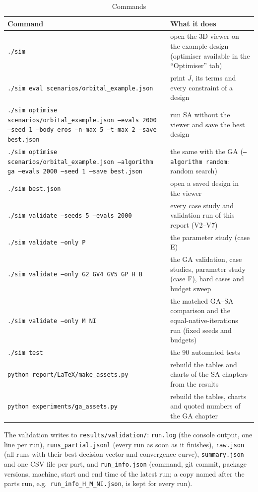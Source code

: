 \begin{table}[H]
\centering
\caption{Commands}
\label{tab:commands}
\footnotesize
\begin{tabularx}{\textwidth}{@{}>{\raggedright\arraybackslash}p{7.6cm}X@{}}
\toprule
Command & What it does \\
\midrule
\texttt{./sim} & open the 3D viewer on the example design (optimiser available in the ``Optimiser'' tab) \\
\texttt{./sim eval scenarios/orbital\_example.json} & print $J$, its terms and every constraint of a design \\
\texttt{./sim optimise scenarios/orbital\_example.json --evals 2000 --seed 1 --body eros --n-max 5 --t-max 2 --save best.json} & run \ac{SA} without the viewer and save the best design \\
\texttt{./sim optimise scenarios/orbital\_example.json --algorithm ga --evals 2000 --seed 1 --save best.json} & the same with the \ac{GA} (\texttt{--algorithm random}: random search) \\
\texttt{./sim best.json} & open a saved design in the viewer \\
\texttt{./sim validate --seeds 5 --evals 2000} & every case study and validation run of this report (V2--V7) \\
\texttt{./sim validate --only P} & the parameter study (case E) \\
\texttt{./sim validate --only G2 GV4 GV5 GP H B} & the \ac{GA} validation, case studies, parameter study (case F), hard cases and budget sweep \\
\texttt{./sim validate --only M NI} & the matched GA--SA comparison and the equal-native-iterations run (fixed seeds and budgets) \\
\texttt{./sim test} & the 90 automated tests \\
\texttt{python report/LaTeX/make\_assets.py} & rebuild the tables and charts of the \ac{SA} chapters from the results \\
\texttt{python experiments/ga\_assets.py} & rebuild the tables, charts and quoted numbers of the \ac{GA} chapter \\
\bottomrule
\end{tabularx}
\end{table}

The validation writes to \texttt{results/validation/}: \texttt{run.log} (the console output, one
line per run), \texttt{runs\_partial.jsonl} (every run as soon as it finishes), \texttt{raw.json}
(all runs with their best decision vector and convergence curve), \texttt{summary.json} and one
CSV file per part, and \texttt{run\_info.json} (command, git commit, package versions, machine, start
and end time of the latest run; a copy named after the parts run, e.g.\ \texttt{run\_info\_H\_M\_NI.json},
is kept for every run).

